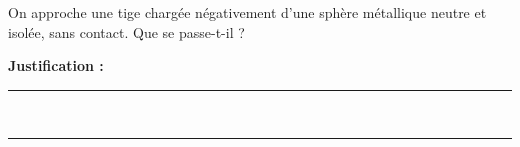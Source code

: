 On approche une tige chargée négativement d'une sphère métallique neutre et isolée, sans contact. Que se passe-t-il ?

\choices

\noindent\textbf{Justification :} \hrulefill \\[2.5ex]
\rule{\linewidth}{0.4pt} \\[2.5ex]
\rule{\linewidth}{0.4pt}
\vfill
